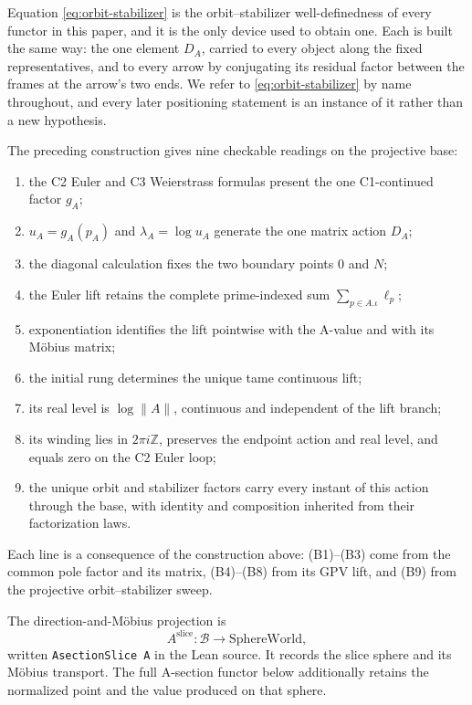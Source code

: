 \documentclass[11pt]{article}
\newcommand{\ZZ}{\mathbb{Z}}
\providecommand{\SphereWorld}{\mathrm{SphereWorld}}
\theoremstyle{plain}
\theoremstyle{definition}
\theoremstyle{remark}
\begin{document}
\begin{tcolorbox}
Equation \eqref{eq:orbit-stabilizer} is the orbit--stabilizer well-definedness
of every functor in this paper, and it is the only device used to obtain one.
Each is built the same way: the one element $D_A$, carried to every object along
the fixed representatives, and to every arrow by conjugating its residual factor
between the frames at the arrow's two ends.
We refer to \eqref{eq:orbit-stabilizer} by name throughout, and every later
positioning statement is an instance of it rather than a new hypothesis.

The preceding construction gives nine checkable readings on the projective base:
\begin{enumerate}[label=\textup{(B\arabic*)},leftmargin=3.2em,itemsep=2pt]
\item the C2 Euler and C3 Weierstrass formulas present the one C1-continued factor $g_A$;
\item $u_A=g_A(p_A)$ and $\lambda_A=\log u_A$ generate the one matrix action $D_A$;
\item the diagonal calculation fixes the two boundary points $0$ and $N$;
\item the Euler lift retains the complete prime-indexed sum
  $\sum_{p\in A.\iota}\ell_p$;
\item exponentiation identifies the lift pointwise with the A-value and with its M\"obius matrix;
\item the initial rung determines the unique tame continuous lift;
\item its real level is $\log\lVert A\rVert$, continuous and independent of the lift branch;
\item its winding lies in $2\pi i\ZZ$, preserves the endpoint action and real level, and equals
  zero on the C2 Euler loop;
\item the unique orbit and stabilizer factors carry every instant of this action through the base,
  with identity and composition inherited from their factorization laws.
\end{enumerate}
Each line is a consequence of the construction above: \textup{(B1)--(B3)} come from the common
pole factor and its matrix, \textup{(B4)--(B8)} from its GPV lift, and \textup{(B9)} from the
projective orbit--stabilizer sweep.

The direction-and-M\"obius projection is
\[
  A^{\mathrm{slice}}:\mathcal B\longrightarrow\SphereWorld,
\]
written \texttt{AsectionSlice\,A} in the Lean source. It records the slice sphere and its
M\"obius transport. The full A-section functor below additionally retains the normalized point
and the value produced on that sphere.


\end{tcolorbox}
\end{document}
